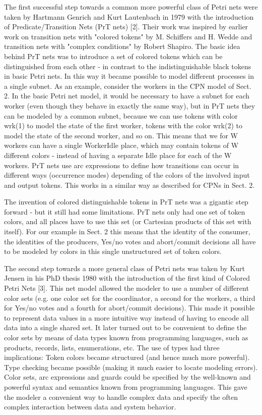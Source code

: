 The first successful step towards a common more powerful class of
Petri nets were taken by Hartmann Genrich and Kurt Lautenbach in 1979
with the introduction of Predicate/Transition Nets (PrT nets)
[2]. Their work was inspired by earlier work on transition nets with
"colored tokens" by M. Schiffers and H. Wedde and transition nets with
"complex conditions" by Robert Shapiro. The basic idea behind PrT nets
was to introduce a set of colored tokens which can be distinguished
from each other - in contrast to the indistinguishable black tokens in
basic Petri nets. In this way it became possible to model different
processes in a single subnet. As an example, consider the workers in
the CPN model of Sect. 2. In the basic Petri net model, it would be
necessary to have a subnet for each worker (even though they behave in
exactly the same way), but in PrT nets they can be modeled by a common
subnet, because we can use tokens with color wrk(1) to model the state
of the first worker, tokens with the color wrk(2) to model the state
of the second worker, and so on. This means that we for W workers can
have a single WorkerIdle place, which may contain tokens of W
different colors - instead of having a separate Idle place for each of
the W workers. PrT nets use arc expressions to define how transitions
can occur in different ways (occurrence modes) depending of the colors
of the involved input and output tokens. This works in a similar way
as described for CPNs in Sect. 2.

The invention of colored distinguishable tokens in PrT nets was a
gigantic step forward - but it still had some limitations. PrT nets
only had one set of token colors, and all places have to use this set
(or Cartesian products of this set with itself). For our example in
Sect. 2 this means that the identity of the consumer, the identities
of the producers, Yes/no votes and abort/commit decisions all have to
be modeled by colors in this single unstructured set of token colors.

The second step towards a more general class of Petri nets was taken
by Kurt Jensen in his PhD thesis 1980 with the introduction of the
first kind of Colored Petri Nets [3]. This net model allowed the
modeler to use a number of different color sets (e.g. one color set
for the coordinator, a second for the workers, a third for Yes/no
votes and a fourth for abort/commit decisions). This made it possible
to represent data values in a more intuitive way instead of having to
encode all data into a single shared set. It later turned out to be
convenient to define the color sets by means of data types known from
programming languages, such as products, records, lists, enumerations,
etc. The use of types had three implications: Token colors became
structured (and hence much more powerful). Type checking became
possible (making it much easier to locate modeling errors). Color
sets, arc expressions and guards could be specified by the well-known
and powerful syntax and semantics known from programming
languages. This gave the modeler a convenient way to handle complex
data and specify the often complex interaction between data and system
behavior.

